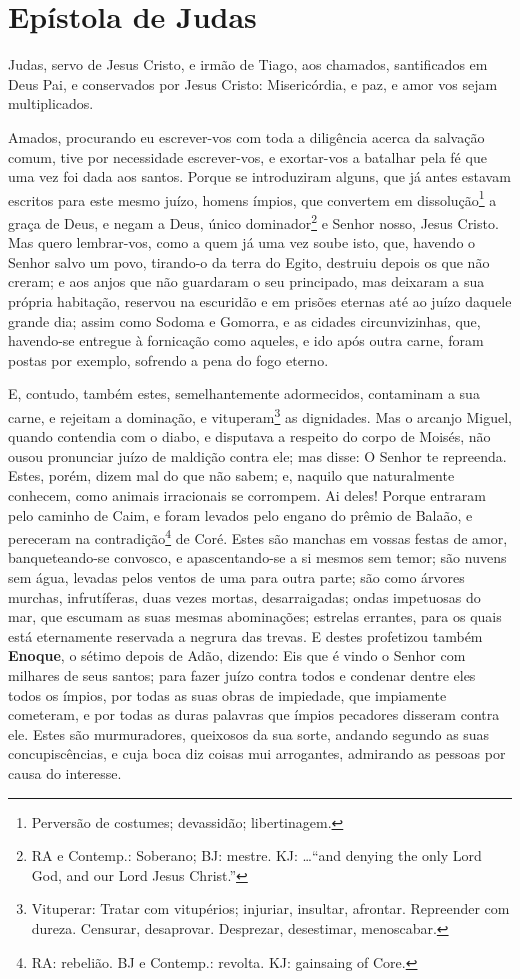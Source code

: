 \thispagestyle{empty}
\chapter*{Epístola de Judas}

Judas, servo de Jesus Cristo, e irmão de Tiago, aos chamados,
santificados em Deus Pai, e conservados por Jesus Cristo:
Misericórdia, e paz, e amor vos sejam multiplicados.

Amados, procurando eu escrever-vos com toda a diligência acerca da
salvação comum, tive por necessidade escrever-vos, e exortar-vos a
batalhar pela fé que uma vez foi dada aos santos. Porque se
introduziram alguns, que já antes estavam escritos para este mesmo
juízo, homens ímpios, que convertem em dissolução\footnote{Perversão
de costumes; devassidão; libertinagem.} a graça de Deus, e negam a
Deus, único dominador\footnote{RA e Contemp.: Soberano; BJ: mestre.
KJ: \ldots ``and denying the only Lord God, and our Lord Jesus
Christ.''} e Senhor nosso, Jesus Cristo. Mas quero lembrar-vos,
como a quem já uma vez soube isto, que, havendo o Senhor salvo um
povo, tirando-o da terra do Egito, destruiu depois os que não
creram; e aos anjos que não guardaram o seu principado, mas
deixaram a sua própria habitação, reservou na escuridão e em prisões
eternas até ao juízo daquele grande dia; assim como Sodoma e
Gomorra, e as cidades circunvizinhas, que, havendo-se entregue à
fornicação como aqueles, e ido após outra carne, foram postas por
exemplo, sofrendo a pena do fogo eterno.

E, contudo, também estes, semelhantemente adormecidos, contaminam
a sua carne, e rejeitam a dominação, e vituperam\footnote{Vituperar:
Tratar com vitupérios; injuriar, insultar, afrontar. Repreender com
dureza. Censurar, desaprovar. Desprezar, desestimar, menoscabar.} as
dignidades. Mas o arcanjo Miguel, quando contendia com o diabo,
e disputava a respeito do corpo de Moisés, não ousou pronunciar
juízo de maldição contra ele; mas disse: O Senhor te repreenda.
Estes, porém, dizem mal do que não sabem; e, naquilo que
naturalmente conhecem, como animais irracionais se corrompem.
Ai deles! Porque entraram pelo caminho de Caim, e foram
levados pelo engano do prêmio de Balaão, e pereceram na
contradição\footnote{RA: rebelião. BJ e Contemp.: revolta. KJ:
gainsaing of Core.} de Coré. Estes são manchas em vossas
festas de amor, banqueteando-se convosco, e apascentando-se a si
mesmos sem temor; são nuvens sem água, levadas pelos ventos de uma
para outra parte; são como árvores murchas, infrutíferas, duas vezes
mortas, desarraigadas; ondas impetuosas do mar, que escumam
as suas mesmas abominações; estrelas errantes, para os quais está
eternamente reservada a negrura das trevas. E destes
profetizou também \textbf{Enoque}, o sétimo depois de Adão, dizendo:
Eis que é vindo o Senhor com milhares de seus santos; para
fazer juízo contra todos e condenar dentre eles todos os ímpios, por
todas as suas obras de impiedade, que impiamente cometeram, e por
todas as duras palavras que ímpios pecadores disseram contra ele.
Estes são murmuradores, queixosos da sua sorte, andando
segundo as suas concupiscências, e cuja boca diz coisas mui
arrogantes, admirando as pessoas por causa do interesse.

